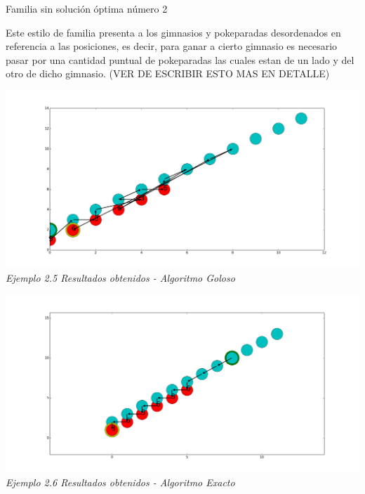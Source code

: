 \begin{center}
Familia sin soluci\'on \'optima n\'umero 2
\end{center}

Este estilo de familia presenta a los gimnasios y pokeparadas desordenados en referencia a las posiciones, es decir, para ganar a cierto gimnasio es necesario pasar por una cantidad puntual de pokeparadas las cuales estan de un lado y del otro de dicho gimnasio.
(VER DE ESCRIBIR ESTO MAS EN DETALLE)

\vspace*{0.3cm} \vspace*{0.3cm}
  \begin{center}
\includegraphics[scale=0.40]{./EJ2/caminosinorden1.png}
\\{\textit{Ejemplo 2.5 Resultados obtenidos - Algoritmo Goloso}}
  \end{center}
  \vspace*{0.3cm}
  
\vspace*{0.3cm} \vspace*{0.3cm}
  \begin{center}
\includegraphics[scale=0.40]{./EJ2/caminosinorden.png}
\\{\textit{Ejemplo 2.6 Resultados obtenidos - Algoritmo Exacto}}
  \end{center}
  \vspace*{0.3cm}

